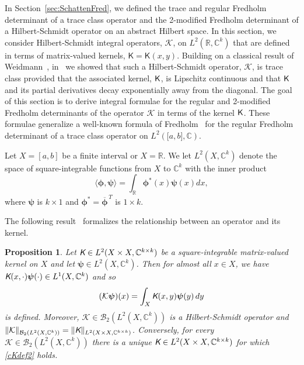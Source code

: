 \documentclass{birkjour}
\newtheorem{prop}[thm]{Proposition}
\theoremstyle{definition}
\theoremstyle{remark}
\numberwithin{equation}{section}
\newcommand{\cB}{{\mathcal B}}
\newcommand{\cK}{{\mathcal K}}
\begin{document}
In Section~\ref{sec:SchattenFred}, 
 we defined  the trace and regular Fredholm determinant of a trace class operator 
 and the 2-modified Fredholm determinant of a Hilbert-Schmidt operator
 on an abstract Hilbert space.  
 In this section, we  consider Hilbert-Schmidt integral operators, $\cK$,
 on  $L^2(\mathbb R,\mathbb{C}^k)$ that are defined in terms of
  matrix-valued kernels, $\textsf{K}=\textsf{K}(x,y)$. 
  Building on a classical result of Weidmann~\cite{weidmann1966integraloperatoren},
  in~\cite{zweck2024regularity} 
  we showed that such a Hilbert-Schmidt operator, $\cK$, is trace class provided that
   the associated kernel, $\textsf K$, is Lipschitz continuous and that
 $\textsf K$ and  its partial derivatives 
  decay  exponentially  away from the diagonal. 
 The goal of this section is to derive integral formulae for the
 regular and 2-modified Fredholm determinants of the operator 
 $\cK$ in terms of the kernel $\textsf K$.  
These formulae generalize a well-known formula of Fredholm~\cite{Fred1903,Simon}
 for the regular Fredholm determinant of a trace class operator on
$L^2(\mathbb [a,b],\mathbb{C})$. 
 
 
Let $X=[a,b]$ be a finite interval or $X=\mathbb R$.
We let $L^2(X,\mathbb{C}^k)$ denote the space of square-integrable functions from $X$ to $\mathbb{C}^k$ with the inner product
\begin{equation}
    \langle \boldsymbol{\phi}, \boldsymbol{\psi} \rangle = \int_{\mathbb{R}} \boldsymbol{\phi}^*(x) \boldsymbol{\psi}(x) dx,
\end{equation}
where $\boldsymbol{\psi}$ is $k \times 1$ and $\boldsymbol{\phi}^* = \overline{\boldsymbol{\phi}}^{\,T}$ is $1\times k$.

The following result~\cite{BirmanSolomjak1987} formalizes the relationship between an operator and its kernel.

\begin{prop}
Let $\emph{\textsf K}\in L^2(X\times X, \mathbb C^{k\times k})$ 
be a square-integrable matrix-valued kernel on $X$ and let
$\boldsymbol\psi\in L^2(X,\mathbb C^k)$.
Then for almost all $x\in X$, we have 
$\emph{\textsf K}(x,\cdot)\boldsymbol\psi(\cdot) \in L^1(X, \mathbb C^k)$
and  so
\begin{equation}\label{cKdef2}
(\cK \boldsymbol\psi)(x)=\int_X \emph{\textsf K}(x,y)\boldsymbol\psi(y)\,dy
\end{equation}
is defined. Moreover, $\cK \in \cB_2(L^2(X,\mathbb C^k ))$ 
is a Hilbert-Schmidt operator
and 
$\| \cK \|_{\cB_2(L^2(X, \mathbb C^k))} = \| \emph{\textsf K} \|_{L^2(X\times X,  \mathbb C^{k\times k}) }$.
Conversely, for every $\cK \in \cB_2(L^2(X, \mathbb C^k))$ there is a unique 
$\emph{\textsf K}\in L^2(X\times X, \mathbb C^{k\times k})$ for which \eqref{cKdef2} holds.
\end{prop}
\end{document}
